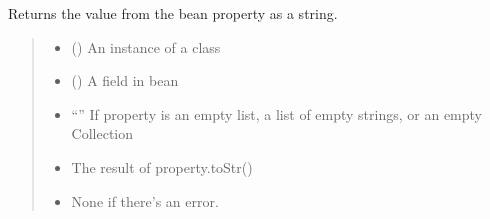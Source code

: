 \documentclass[letterpaper,10pt,english]{sphinxmanual}
\begin{document}
\begin{fulllineitems}
\begin{fulllineitems}
\label{\detokenize{apache_commons_validator_python.util:apache_commons_validator_python.util.validator_utils.ValidatorUtils.get_value_as_string}}
\pysigstartsignatures
{}
\pysigstopsignatures
\sphinxAtStartPar
Returns the value from the bean property as a string.
\begin{quote}\begin{description}
\begin{itemize}
\item {} 
\sphinxAtStartPar
{} () \textendash{} An instance of a class

\item {} 
\sphinxAtStartPar
{} () \textendash{} A field in bean

\end{itemize}

\sphinxAtStartPar
\begin{itemize}
\item {} 
\sphinxAtStartPar
“” If property is an empty list, a list of empty strings, or an empty Collection

\item {} 
\sphinxAtStartPar
The result of property.toStr()

\item {} 
\sphinxAtStartPar
None if there’s an error.

\end{itemize}


\end{description}\end{quote}

\end{fulllineitems}



\end{fulllineitems}
\end{document}
